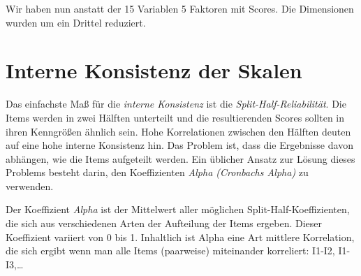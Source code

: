 \documentclass[12pt,ngerman,]{book}
\makeatletter
\newenvironment{Shaded}{\begin{snugshade}}{\end{snugshade}}
\newcommand{\KeywordTok}[1]{\textcolor[rgb]{0.13,0.29,0.53}{\textbf{#1}}}
\newcommand{\DataTypeTok}[1]{\textcolor[rgb]{0.13,0.29,0.53}{#1}}
\newcommand{\DecValTok}[1]{\textcolor[rgb]{0.00,0.00,0.81}{#1}}
\newcommand{\StringTok}[1]{\textcolor[rgb]{0.31,0.60,0.02}{#1}}
\newcommand{\CommentTok}[1]{\textcolor[rgb]{0.56,0.35,0.01}{\textit{#1}}}
\newcommand{\OperatorTok}[1]{\textcolor[rgb]{0.81,0.36,0.00}{\textbf{#1}}}
\newcommand{\NormalTok}[1]{#1}
\newenvironment{kframe}{%
\medskip{}
\setlength{\fboxsep}{.8em}
 \def\at@end@of@kframe{}%
 \ifinner\ifhmode%
  \def\at@end@of@kframe{\end{minipage}}%
  \begin{minipage}{\columnwidth}%
 \fi\fi%
 \def\FrameCommand##1{\hskip\@totalleftmargin \hskip-\fboxsep
 \colorbox{shadecolor}{##1}\hskip-\fboxsep
     \hskip-\linewidth \hskip-\@totalleftmargin \hskip\columnwidth}%
 \MakeFramed {\advance\hsize-\width
   \@totalleftmargin\z@ \linewidth\hsize
   \@setminipage}}%
 {\par\unskip\endMakeFramed%
 \at@end@of@kframe}
\renewenvironment{Shaded}{\begin{kframe}}{\end{kframe}}
\theoremstyle{definition}
\theoremstyle{definition}
\theoremstyle{remark}
\makeatother
\begin{document}
\begin{Shaded}
\end{Shaded}

Wir haben nun anstatt der 15 Variablen 5 Faktoren mit Scores. Die
Dimensionen wurden um ein Drittel reduziert.

\section{Interne Konsistenz der
Skalen}\label{interne-konsistenz-der-skalen}

Das einfachste Maß für die \emph{interne
Konsistenz} ist die
\emph{Split-Half-Reliabilität}. Die Items
werden in zwei Hälften unterteilt und die resultierenden Scores sollten
in ihren Kenngrößen ähnlich sein. Hohe Korrelationen zwischen den
Hälften deuten auf eine hohe interne Konsistenz hin. Das Problem ist,
dass die Ergebnisse davon abhängen, wie die Items aufgeteilt werden. Ein
üblicher Ansatz zur Lösung dieses Problems besteht darin, den
Koeffizienten \emph{Alpha (Cronbachs Alpha)} zu
verwenden.

Der Koeffizient \emph{Alpha} ist der Mittelwert aller möglichen
Split-Half-Koeffizienten, die sich aus verschiedenen Arten der
Aufteilung der Items ergeben. Dieser Koeffizient variiert von 0 bis 1.
Inhaltlich ist Alpha eine Art mittlere Korrelation, die sich ergibt wenn
man alle Items (paarweise) miteinander korreliert: I1-I2, I1-I3,\ldots{}
\end{document}
